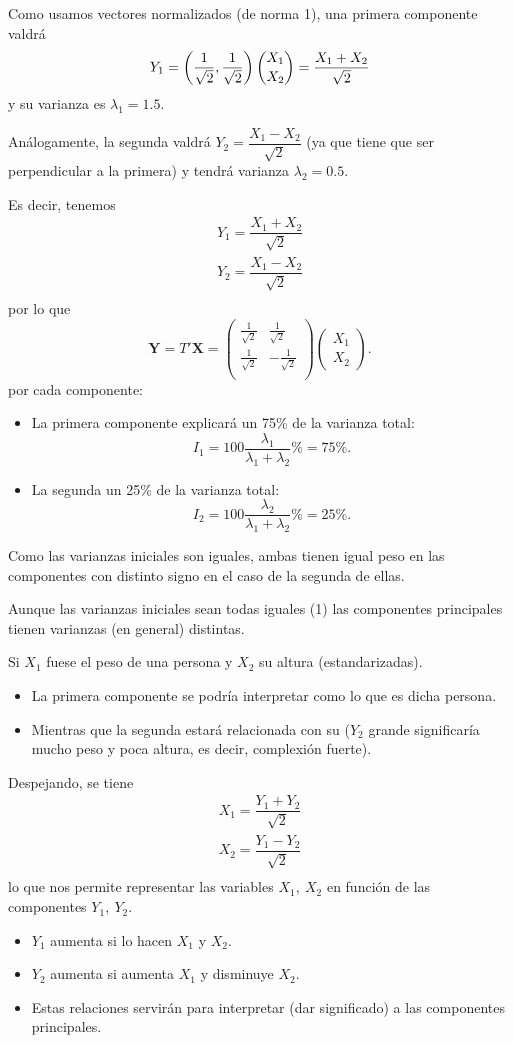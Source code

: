 Como usamos vectores normalizados (de norma 1), una primera componente valdrá \[ Y_1=\left(\dfrac{1}{\sqrt{2}},\dfrac{1}{\sqrt{2}}\right)\dbinom{X_1}{X_2}=\dfrac{X_1+X_2}{\sqrt{2}} \]y su varianza es $\lambda_1=1.5$.

Análogamente, la segunda valdrá $Y_2=\dfrac{X_1-X_2}{\sqrt{2}}$ (ya que tiene que ser perpendicular a la primera) y tendrá varianza $\lambda_2=0.5$.

Es decir, tenemos \[ \begin{array}{l}
	Y_1=\dfrac{X_1+X_2}{\sqrt{2}}\\
	Y_2=\dfrac{X_1-X_2}{\sqrt{2}}\\
\end{array} \]por lo que \[ \mathbf{Y}=T'\mathbf{X}=\begin{pmatrix}
\frac{1}{\sqrt{2}} & \frac{1}{\sqrt{2}}\\
\frac{1}{\sqrt{2}} & -\frac{1}{\sqrt{2}}\\
\end{pmatrix}\begin{pmatrix}
X_1\\
X_2
\end{pmatrix}. \]
 por cada componente:
\begin{itemize}
	\item La primera componente explicará un 75\% de la varianza total: \[ I_1=100\dfrac{\lambda_1}{\lambda_1+\lambda_2}\%=75\%. \]
	\item La segunda un 25\% de la varianza total: \[ I_2=100\dfrac{\lambda_2}{\lambda_1+\lambda_2}\%=25\%. \]
\end{itemize}
Como las varianzas iniciales son iguales, ambas tienen igual peso en las componentes con distinto signo en el caso de la segunda de ellas.

Aunque las varianzas iniciales sean todas iguales (1) las componentes principales tienen varianzas (en general) distintas.

Si $X_1$ fuese el peso de una persona y $X_2$ su altura (estandarizadas).
\begin{itemize}
	\item La primera componente se podría interpretar como lo  que es dicha persona.
	\item Mientras que la segunda estará relacionada con su  ($Y_2$ grande significaría mucho peso y poca altura, es decir, complexión fuerte).
\end{itemize}
Despejando, se tiene \[ \begin{array}{l}
	X_1=\dfrac{Y_1+Y_2}{\sqrt{2}}\\
	X_2=\dfrac{Y_1-Y_2}{\sqrt{2}}\\
\end{array} \] lo que nos permite representar las variables $X_1,\:X_2$ en función de las componentes $Y_1,\:Y_2$.
\begin{itemize}
	\item $Y_1$ aumenta si lo hacen $X_1$ y $X_2$.
	\item $Y_2$ aumenta si aumenta $X_1$ y disminuye $X_2$.
	\item Estas relaciones servirán para interpretar (dar significado) a las componentes principales.
\end{itemize}
